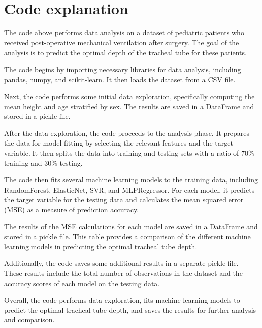 \documentclass[11pt]{article}
\author{Data to Paper}
\begin{document}
\section*{Code explanation}

The code above performs data analysis on a dataset of pediatric patients who received post-operative mechanical ventilation after surgery. The goal of the analysis is to predict the optimal depth of the tracheal tube for these patients.

The code begins by importing necessary libraries for data analysis, including pandas, numpy, and scikit-learn. It then loads the dataset from a CSV file.

Next, the code performs some initial data exploration, specifically computing the mean height and age stratified by sex. The results are saved in a DataFrame and stored in a pickle file.

After the data exploration, the code proceeds to the analysis phase. It prepares the data for model fitting by selecting the relevant features and the target variable. It then splits the data into training and testing sets with a ratio of 70\% training and 30\% testing.

The code then fits several machine learning models to the training data, including RandomForest, ElasticNet, SVR, and MLPRegressor. For each model, it predicts the target variable for the testing data and calculates the mean squared error (MSE) as a measure of prediction accuracy.

The results of the MSE calculations for each model are saved in a DataFrame and stored in a pickle file. This table provides a comparison of the different machine learning models in predicting the optimal tracheal tube depth.

Additionally, the code saves some additional results in a separate pickle file. These results include the total number of observations in the dataset and the accuracy scores of each model on the testing data.

Overall, the code performs data exploration, fits machine learning models to predict the optimal tracheal tube depth, and saves the results for further analysis and comparison.
\end{document}
